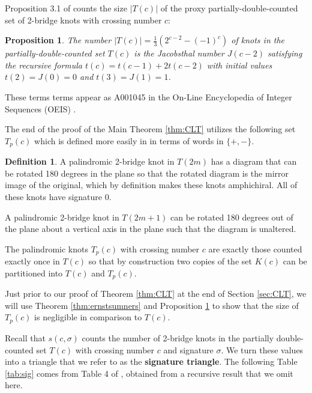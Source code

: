 \documentclass[11pt]{amsart}
\newtheorem{proposition}[theorem]{Proposition}
\theoremstyle{definition}
\newtheorem{definition}[theorem]{Definition}
\theoremstyle{remark}
\numberwithin{equation}{section}
\begin{document}
Proposition 3.1 of \cite{CohLow} counts the size $|T(c)|$ of the proxy partially-double-counted set of 2-bridge knots with crossing number $c$:


\begin{proposition}
\cite[Proposition 3.1]{CohLow}
\label{prop:CohLowT}
The number $|T(c)| = \frac{1}{3}(2^{c-2} - (-1)^c)$ of knots in the partially-double-counted set $T(c)$ is the Jacobsthal number $J(c-2)$ satisfying the recursive formula $t(c)=t(c-1)+2t(c-2)$ with initial values $t(2)=J(0)=0$ and $t(3)=J(1)=1$.
\end{proposition}

  These terms terms appear as A001045 in the On-Line Encyclopedia of Integer Sequences (OEIS) \cite{OEIS}.

The end of the proof of the Main Theorem \ref{thm:CLT} utilizes the following set $T_p(c)$ which is defined more easily in \cite{CohLow} in terms of words in $\{+,-\}$.


\begin{definition}
\label{def:palindrome}
A palindromic 2-bridge knot in $T(2m)$ has a diagram that can be rotated 180 degrees in the plane so that the rotated diagram is the mirror image of the original, which by definition makes these knots  amphichiral.    All of these knots have signature 0.

A palindromic 2-bridge knot in $T(2m+1)$ can be rotated 180 degrees out of the plane about a vertical axis in the plane such that the diagram is unaltered.

The palindromic knots $T_p(c)$ with crossing number $c$ are exactly those counted exactly once in $T(c)$ so that by construction two copies of the set $K(c)$ can be partitioned into $T(c)$ and $T_p(c)$.
\end{definition}


Just prior to our proof of Theorem \ref{thm:CLT} at the end of Section \ref{sec:CLT}, we will use Theorem \ref{thm:ernstsumners} and Proposition \ref{prop:CohLowT} to show that the size of $T_p(c)$ is negligible in comparison to $T(c)$.



Recall that $s(c,\sigma)$ counts the number of 2-bridge knots in the partially double-counted set $T(c)$ with crossing number $c$ and signature $\sigma$.  We turn these values into a triangle that we refer to as the \textbf{signature triangle}.  The following Table \ref{tab:sig} comes from Table 4 of \cite{CLMR}, obtained from a recursive result that we omit here.
\end{document}
